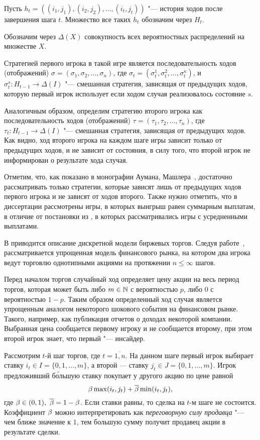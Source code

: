 Пусть $h_t = \left((i_1, j_1), (i_2, j_2), \ldots, (i_t, j_t)\right)$ "--- история ходов после завершения шага $t$.
Множество все таких $h_t$ обозначим через $H_t$. 

Обозначим через $\Delta(X)$ совокупность всех вероятностных распределений на множестве $X$.

Стратегией первого игрока в такой игре является последовательность ходов (отображений) $\sigma = (\sigma_1, \sigma_2, \ldots, \sigma_n)$, где $\sigma_t = (\sigma^1_t, \sigma^2_t, \ldots, \sigma^\kappa_t)$, и $\sigma^s_t: H_{t-1} \rightarrow \Delta(I)$ "--- смешанная стратегия, зависящая от предыдущих ходов, которую первый игрок использует если ходом случая реализовалось состояние $s$.

Аналогичным образом, определим стратегию второго игрока как последовательность ходов (отображений) $\tau = (\tau_1, \tau_2, \ldots, \tau_n)$, где $\tau_t: H_{t-1} \rightarrow \Delta(I)$ "--- смешанная стратегия, зависящая от предыдущих ходов.
Как видно, ход второго игрока на каждом шаге игры зависит только от предыдущих ходов, и не зависит от состояния, в силу того, что второй игрок не информирован о результате хода случая.

Отметим, что, как показано в монографии Аумана, Машлера~\cite{aumann95}, достаточно рассматривать только стратегии, которые зависят лишь от предыдущих ходов первого игрока и не зависят от ходов второго.
%
Также нужно отметить, что в диссертации рассмотрены игры, в которых выигрыш равен суммарным выплатам, в отличие от постановки из \cite{aumann95}, в которых рассматривались игры с усредненными выплатами.

В  приводится описание дискретной модели биржевых торгов.
Следуя работе~\cite{domansky07}, рассматривается упрощенная модель финансового рынка, на котором два игрока ведут торговлю однотипными акциями на протяжении $n \leqslant \infty$ шагов.

Перед началом торгов случайный ход определяет цену акции на весь период торгов, которая может быть либо $m \in \mathbb{N}$ с вероятностью $p$, либо $0$ с вероятностью $1-p$.
Таким образом определенный ход случая является упрощенным аналогом некоторого шокового события на финансовом рынке.
Такого, например, как публикация отчетов о доходах некоторой компании.
Выбранная цена сообщается первому игроку и не сообщается второму, при этом второй игрок знает, что первый "--- инсайдер.

Рассмотрим $t$-й шаг торгов, где $t = \overline{1,n}$.
На данном шаге первый игрок выбирает ставку $i_t \in I = \{0, 1, \ldots, m\}$, а второй --- ставку $j_t \in J = \{0, 1, \ldots, m\}$.
Игрок предложивший б\'{о}льшую ставку покупает у другого акцию по цене равной
\[
  \beta \max(i_t, j_t) + {\overline{\beta}} \min(i_t, j_t),
\]
где $\beta \in (0, 1),\ {\overline{\beta}} = 1 - \beta$.
Если ставки равны, то сделка на $t$-м шаге не состоится.
Коэффициент $\beta$ можно интерпретировать как \emph{переговорную силу продавца} "--- чем ближе значение к $1$, тем большую сумму получит продавец акции в результате сделки.

